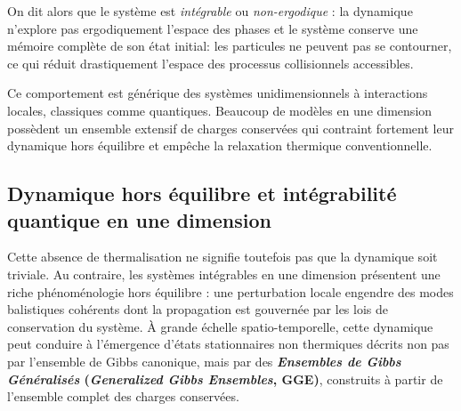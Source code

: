 \smallskip

On dit alors que le système est \emph{intégrable} ou \emph{non-ergodique} : la
dynamique n’explore pas ergodiquement l’espace des phases et le système
conserve une mémoire complète de son état initial: les particules ne peuvent
pas se contourner, ce qui réduit drastiquement l’espace des processus
collisionnels accessibles.%

\smallskip

Ce comportement est générique des systèmes unidimensionnels à interactions
locales, classiques comme quantiques. Beaucoup de modèles en une dimension
possèdent un ensemble extensif de charges conservées qui contraint fortement
leur dynamique hors équilibre et empêche la relaxation thermique
conventionnelle.

\smallskip


\vspace{-0.5cm}

\subsection{Dynamique hors équilibre et intégrabilité quantique en une dimension}



Cette absence de thermalisation ne signifie toutefois pas que la dynamique soit
triviale. Au contraire, les systèmes intégrables en une dimension présentent
une riche phénoménologie hors équilibre : une perturbation locale engendre des
modes balistiques cohérents dont la propagation est gouvernée par les lois de
conservation du système. À grande échelle spatio-temporelle, cette dynamique
peut conduire à l’émergence d’états stationnaires non thermiques décrits non
pas par l’ensemble de Gibbs canonique, mais par des {\bf \emph{Ensembles de
            Gibbs Généralisés} (\emph{Generalized Gibbs Ensembles}, \textsf{GGE})},
construits à partir de l’ensemble complet des charges conservées.

